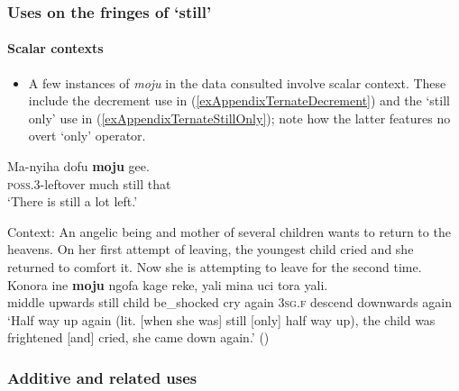 \subsubsection{Uses on the fringes of \lq{}still\rq{}}
\paragraph{Scalar contexts}\label{appendixTernateScalar}
\begin{itemize}
	\item A few instances of \textit{moju} in the data consulted involve scalar context. These include the decrement use in (\ref{exAppendixTernateDecrement}) and the \lq still only' use in (\ref{exAppendixTernateStillOnly}); note how the latter features no overt \lq only\rq{ }operator.
\end{itemize}

\begin{exe}
	\ex\label{exAppendixTernateDecrement}
	\gll Ma-nyiha dofu \textbf{moju} gee.\\
	\textsc{poss}.3-leftover much still that\\
	\glt \lq There is still a lot left.' \parencite[93]{Hayami2001}
	
	\ex
	\label{exAppendixTernateStillOnly}
	 Context: An angelic being and mother of several children wants to return to the heavens. On her first attempt of leaving, the youngest child cried and she returned to comfort it. Now she is attempting to leave for the second time.\\
	\gll Konora ine \textbf{moju} ngofa kage reke, yali mina uci tora yali.\\
	middle upwards still child be\_shocked cry again 3\textsc{sg}.\textsc{f} descend downwards again\\
	\glt \lq Half way up again (lit. [when she was] still [only] half way up), the child was frightened [and] cried, she came down again.' (\cite[375]{vanStaden2000})
\end{exe}

\subsubsection{Additive and related uses}

